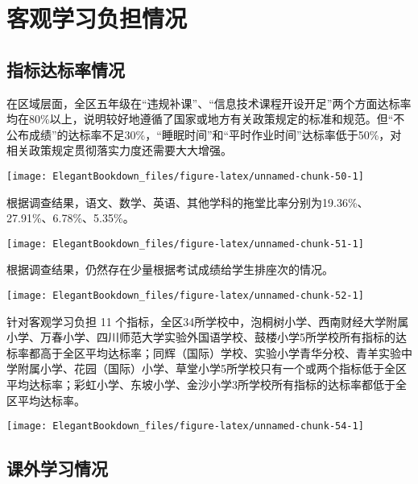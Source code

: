 \documentclass[cn, 11pt, fancy, hide]{elegantbook}
\begin{document}
\hypertarget{section-16}{%
\section{客观学习负担情况}\label{section-16}}

\hypertarget{section-17}{%
\subsection{指标达标率情况}\label{section-17}}

在区域层面，全区五年级在``违规补课''、``信息技术课程开设开足''两个方面达标率均在80\%以上，说明较好地遵循了国家或地方有关政策规定的标准和规范。但``不公布成绩''的达标率不足30\%，``睡眠时间''和``平时作业时间''达标率低于50\%，对相关政策规定贯彻落实力度还需要大大增强。

\begin{center}\texttt{[image: ElegantBookdown\_files/figure-latex/unnamed-chunk-50-1]} \end{center}

根据调查结果，语文、数学、英语、其他学科的拖堂比率分别为19.36\%、27.91\%、6.78\%、5.35\%。

\begin{center}\texttt{[image: ElegantBookdown\_files/figure-latex/unnamed-chunk-51-1]} \end{center}

根据调查结果，仍然存在少量根据考试成绩给学生排座次的情况。

\begin{center}\texttt{[image: ElegantBookdown\_files/figure-latex/unnamed-chunk-52-1]} \end{center}

针对客观学习负担 11 个指标，全区34所学校中，泡桐树小学、西南财经大学附属小学、万春小学、四川师范大学实验外国语学校、鼓楼小学5所学校所有指标的达标率都高于全区平均达标率；同辉（国际）学校、实验小学青华分校、青羊实验中学附属小学、花园（国际）小学、草堂小学5所学校只有一个或两个指标低于全区平均达标率；彩虹小学、东坡小学、金沙小学3所学校所有指标的达标率都低于全区平均达标率。

\begin{center}\texttt{[image: ElegantBookdown\_files/figure-latex/unnamed-chunk-54-1]} \end{center}

\hypertarget{section-18}{%
\subsection{课外学习情况}\label{section-18}}
\end{document}
